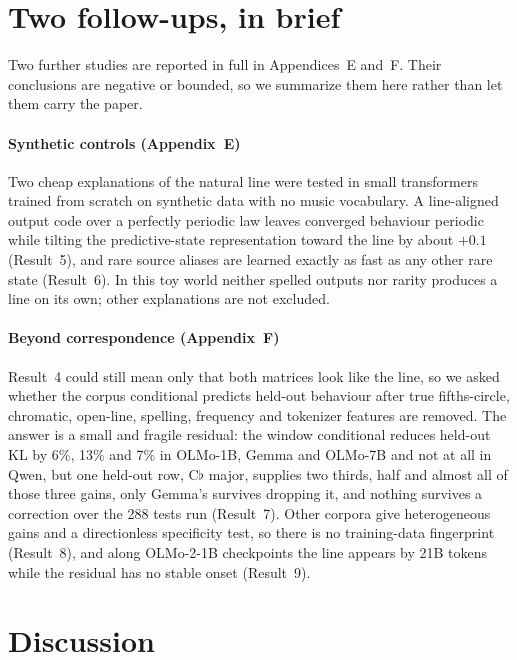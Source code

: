 \documentclass[11pt]{article}
\newcommand{\fl}{$\flat$}
\begin{document}
\section{Two follow-ups, in brief}\label{sec:followups}

Two further studies are reported in full in Appendices~E and~F. Their conclusions are negative or bounded, so we summarize them here rather than let them carry the paper.

\paragraph{Synthetic controls (Appendix~E)} Two cheap explanations of the natural line were tested in small transformers trained from scratch on synthetic data with no music vocabulary. A line-aligned output code over a perfectly periodic law leaves converged behaviour periodic while tilting the predictive-state representation toward the line by about $+0.1$ (Result~5), and rare source aliases are learned exactly as fast as any other rare state (Result~6). In this toy world neither spelled outputs nor rarity produces a line on its own; other explanations are not excluded.

\paragraph{Beyond correspondence (Appendix~F)} Result~4 could still mean only that both matrices look like the line, so we asked whether the corpus conditional predicts held-out behaviour after true fifths-circle, chromatic, open-line, spelling, frequency and tokenizer features are removed. The answer is a small and fragile residual: the window conditional reduces held-out KL by 6\%, 13\% and 7\% in OLMo-1B, Gemma and OLMo-7B and not at all in Qwen, but one held-out row, C\fl{} major, supplies two thirds, half and almost all of those three gains, only Gemma's survives dropping it, and nothing survives a correction over the 288 tests run (Result~7). Other corpora give heterogeneous gains and a directionless specificity test, so there is no training-data fingerprint (Result~8), and along OLMo-2-1B checkpoints the line appears by 21B tokens while the residual has no stable onset (Result~9).

\section{Discussion}\label{sec:discussion}
\end{document}
